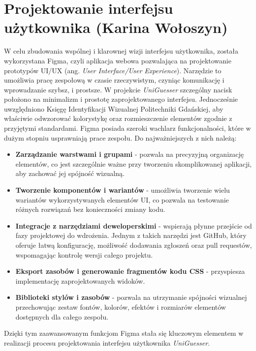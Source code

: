\section{Projektowanie interfejsu użytkownika (Karina Wołoszyn)}

W celu zbudowania wspólnej i klarownej wizji interfejsu użytkownika, została wykorzystana Figma, czyli aplikacja webowa pozwalająca na projektowanie prototypów UI/UX (ang. \textit{User Interface/User Experience}). Narzędzie to umożliwia pracę zespołową w czasie rzeczywistym, czyniąc komunikację i wprowadzanie szybsz, i prostsze. W projekcie \textit{UniGuesser} szczególny nacisk położono na minimalizm i prostotę zaprojektowanego interfejsu. Jednocześnie uwzględniono Księgę Identyfikacji Wizualnej Politechniki Gdańskiej, aby właściwie odwzorować kolorystykę oraz rozmieszczenie elementów zgodnie z przyjętymi standardami.
Figma posiada szeroki wachlarz funkcjonalności, które w dużym stopniu usprawniają prace zespołu. Do najważniejszych z nich należą:

\begin{itemize}
    \item \textbf{Zarządzanie warstwami i grupami} - pozwala na precyzyjną organizację elementów, co jest szczególnie ważne przy tworzeniu skomplikowanej aplikacji, aby zachować jej spójność wizualną.
    \item \textbf{Tworzenie komponentów i wariantów} - umożliwia tworzenie wielu wariantów wykorzystywanych elementów UI, co pozwala na testowanie różnych rozwiązań bez konieczności zmiany kodu.
\pagebreak
    \item \textbf{Integracje z narzędziami deweloperskimi} - wspierają płynne przejście od fazy projektowej do wdrożenia. Jednym z takich narzędzi jest GitHub, który oferuje łatwą konfigurację, możliwość dodawania zgłoszeń oraz pull requestów, wspomagając kontrolę wersji całego projektu.
    \item \textbf{Eksport zasobów i generowanie fragmentów kodu CSS} - przyspiesza implementację zaprojektowanych widoków.
    \item \textbf{Biblioteki stylów i zasobów} - pozwala na utrzymanie spójności wizualnej przechowując zestaw fontów, kolorów, efektów i rozmiarów elementów dostępnych dla całego zespołu.
\end{itemize}

Dzięki tym zaawansowanym funkcjom Figma stała się kluczowym elementem w realizacji procesu projektowania interfejsu użytkownika \textit{UniGuesser}.
